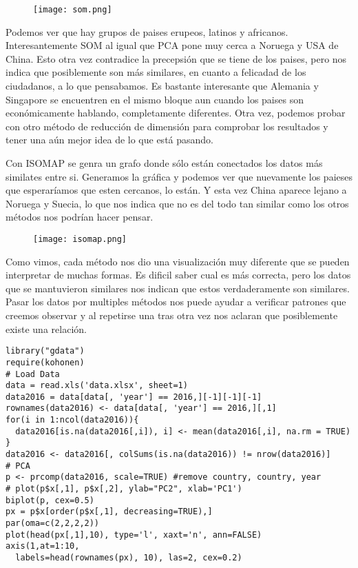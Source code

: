 \documentclass{article}
\begin{document}
\begin{enumerate}
\begin{figure}[ht]
\centering
\texttt{[image: som.png]}
\end{figure}

Podemos ver que hay grupos de paises erupeos, latinos y africanos. Interesantemente SOM al igual que PCA pone muy cerca a Noruega y USA de China. Esto otra vez contradice la precepsión que se tiene de los paises, pero nos indica que posiblemente son más similares, en cuanto a felicadad de los ciudadanos, a lo que pensabamos. Es bastante interesante que Alemania y Singapore se encuentren en el mismo bloque aun cuando los paises son económicamente hablando, completamente diferentes. Otra vez, podemos probar con otro método de reducción de dimensión para comprobar los resultados y tener una aún mejor idea de lo que está pasando.

Con ISOMAP se genra un grafo donde sólo están conectados los datos más similates entre si. Generamos la gráfica y podemos ver que nuevamente los paieses que esperaríamos que esten cercanos, lo están. Y esta vez China aparece lejano a Noruega y Suecia, lo que nos indica que no es del todo tan similar como los otros métodos nos podrían hacer pensar.

\newpage
\begin{figure}[ht]
\centering
\texttt{[image: isomap.png]}
\end{figure}

Como vimos, cada método nos dio una visualización muy diferente que se pueden interpretar de muchas formas. Es dificil saber cual es más correcta, pero los datos que se mantuvieron similares nos indican que estos verdaderamente son similares. Pasar los datos por multiples métodos nos puede ayudar a verificar patrones que creemos observar y al repetirse una tras otra vez nos aclaran que posiblemente existe una relación.

\begin{lstlisting}[frame=single]  % Start your code-block
library("gdata")
require(kohonen)
# Load Data
data = read.xls('data.xlsx', sheet=1)
data2016 = data[data[, 'year'] == 2016,][-1][-1][-1]
rownames(data2016) <- data[data[, 'year'] == 2016,][,1]
for(i in 1:ncol(data2016)){
  data2016[is.na(data2016[,i]), i] <- mean(data2016[,i], na.rm = TRUE)
}
data2016 <- data2016[, colSums(is.na(data2016)) != nrow(data2016)]
# PCA
p <- prcomp(data2016, scale=TRUE) #remove country, country, year
# plot(p$x[,1], p$x[,2], ylab="PC2", xlab='PC1')
biplot(p, cex=0.5)
px = p$x[order(p$x[,1], decreasing=TRUE),]
par(oma=c(2,2,2,2))
plot(head(px[,1],10), type='l', xaxt='n', ann=FALSE)
axis(1,at=1:10, 
  labels=head(rownames(px), 10), las=2, cex=0.2)


\end{lstlisting}
\end{enumerate}
\end{document}
